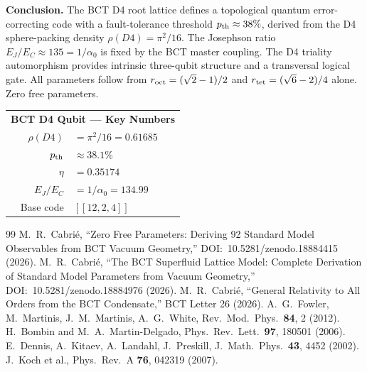\documentclass[aps,prl,twocolumn,superscriptaddress,floatfix]{revtex4-2}
\begin{document}
\medskip
\noindent\textbf{Conclusion.}
The BCT D4 root lattice defines a topological quantum error-correcting code
with a fault-tolerance threshold $p_{\rm th} \approx 38\%$, derived from
the D4 sphere-packing density $\rho(D4) = \pi^2/16$.
The Josephson ratio $E_J/E_C \approx 135 = 1/\alpha_0$ is fixed by the
BCT master coupling. The D4 triality automorphism provides intrinsic
three-qubit structure and a transversal logical gate.
All parameters follow from $r_{\rm oct} = (\sqrt{2}-1)/2$ and
$r_{\rm tet} = (\sqrt{6}-2)/4$ alone. Zero free parameters.

\bigskip
\begin{center}
\begin{small}
\begin{tabular}{rl}
\multicolumn{2}{c}{\textbf{BCT D4 Qubit — Key Numbers}} \\[2pt]
$\rho(D4)$ & $= \pi^2/16 = 0.61685$ \\
$p_{\rm th}$ & $\approx 38.1\%$ \\
$\eta$ & $= 0.35174$ \\
$E_J/E_C$ & $= 1/\alpha_0 = 134.99$ \\
Base code & $[[12,2,4]]$ \\
\end{tabular}
\end{small}
\end{center}

\begin{thebibliography}{99}
 M.~R.~Cabri\'e,
  ``Zero Free Parameters: Deriving 92 Standard Model Observables
  from BCT Vacuum Geometry,''
  DOI:~10.5281/zenodo.18884415 (2026).
 M.~R.~Cabri\'e,
  ``The BCT Superfluid Lattice Model: Complete Derivation of Standard Model
  Parameters from Vacuum Geometry,''
  DOI:~10.5281/zenodo.18884976 (2026).
 M.~R.~Cabri\'e,
  ``General Relativity to All Orders from the BCT Condensate,''
  BCT Letter 26 (2026).
 A.~G.~Fowler, M.~Martinis, J.~M.~Martinis, A.~G.~White,
  Rev.\ Mod.\ Phys.\ \textbf{84}, 2 (2012).
 H.~Bombin and M.~A.~Martin-Delgado,
  Phys.\ Rev.\ Lett.\ \textbf{97}, 180501 (2006).
 E.~Dennis, A.~Kitaev, A.~Landahl, J.~Preskill,
  J.\ Math.\ Phys.\ \textbf{43}, 4452 (2002).
 J.~Koch et al.,
  Phys.\ Rev.\ A \textbf{76}, 042319 (2007).
\end{thebibliography}
\end{document}
